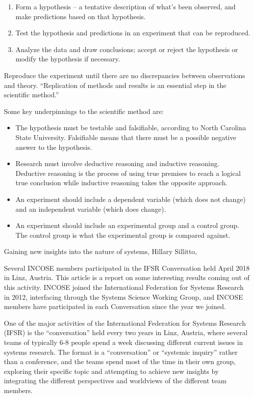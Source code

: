 \begin{enumerate}
\item Form a hypothesis – a tentative description of what’s been observed, and make predictions based on that hypothesis.
\item Test the hypothesis and predictions in an experiment that can be reproduced.
\item Analyze the data and draw conclusions; accept or reject the hypothesis or modify the hypothesis if necessary.
\end{enumerate}

Reproduce the experiment until there are no discrepancies between observations and theory. ``Replication of methods and results is an essential step in the scientific method.''

Some key underpinnings to the scientific method are:
\begin{itemize}
\item The hypothesis must be testable and falsifiable, according to North Carolina State University. Falsifiable means that there must be a possible negative answer to the hypothesis.
\item Research must involve deductive reasoning and inductive reasoning. Deductive reasoning is the process of using true premises to reach a logical true conclusion while inductive reasoning takes the opposite approach.
\item An experiment should include a dependent variable (which does not change) and an independent variable (which does change).
\item An experiment should include an experimental group and a control group. The control group is what the experimental group is compared against.
\end{itemize}

Gaining new insights into the nature of systems, Hillary Sillitto, 

Several INCOSE members participated in the IFSR Conversation held April 2018 in Linz, Austria. This article is a report on some interesting results coming out of this activity. INCOSE joined the International Federation for Systems Research in 2012, interfacing through the Systems Science Working Group, and INCOSE members have participated in each Conversation since the year we joined.

One of the major activities of the International Federation for Systems Research (IFSR) is the ``conversation'' held every two years in Linz, Austria, where several teams of typically 6-8 people spend a week discussing different current issues in systems research. The format is a ``conversation'' or ``systemic inquiry'' rather than a conference, and the teams spend most of the time in their own group, exploring their specific topic and attempting to achieve new insights by integrating the different perspectives and worldviews of the different team members. 

